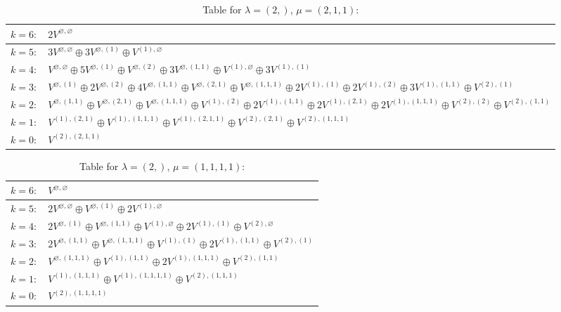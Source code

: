 \documentclass[a4paper,12pt]{article}
\begin{document}
\renewcommand{\arraystretch}{1.6} 
\begin{table}[H]
\centering
\caption{Table for $\lambda = (2,)$, $\mu = (2, 1, 1)$:}
\begin{tabular}{|>{\centering\arraybackslash}p{15cm}|}
\hline
 $k = 6: \quad 2 V^{\varnothing, \varnothing} $ \\ \hline
 $k = 5: \quad 3 V^{\varnothing, \varnothing} \oplus 3 V^{\varnothing, (1)} \oplus V^{(1), \varnothing} $ \\ \hline
 $k = 4: \quad V^{\varnothing, \varnothing} \oplus 5 V^{\varnothing, (1)} \oplus V^{\varnothing, (2)} \oplus 3 V^{\varnothing, (1, 1)} \oplus V^{(1), \varnothing} \oplus 3 V^{(1), (1)} $ \\ \hline
 $k = 3: \quad V^{\varnothing, (1)} \oplus 2 V^{\varnothing, (2)} \oplus 4 V^{\varnothing, (1, 1)} \oplus V^{\varnothing, (2, 1)} \oplus V^{\varnothing, (1, 1, 1)} \oplus 2 V^{(1), (1)} \oplus 2 V^{(1), (2)} \oplus 3 V^{(1), (1, 1)} \oplus V^{(2), (1)} $ \\ \hline
 $k = 2: \quad V^{\varnothing, (1, 1)} \oplus V^{\varnothing, (2, 1)} \oplus V^{\varnothing, (1, 1, 1)} \oplus V^{(1), (2)} \oplus 2 V^{(1), (1, 1)} \oplus 2 V^{(1), (2, 1)} \oplus 2 V^{(1), (1, 1, 1)} \oplus V^{(2), (2)} \oplus V^{(2), (1, 1)} $ \\ \hline
 $k = 1: \quad V^{(1), (2, 1)} \oplus V^{(1), (1, 1, 1)} \oplus V^{(1), (2, 1, 1)} \oplus V^{(2), (2, 1)} \oplus V^{(2), (1, 1, 1)} $ \\ \hline
 $k = 0: \quad V^{(2), (2, 1, 1)} $ \\ \hline
\end{tabular}
\end{table}

\renewcommand{\arraystretch}{1.6} 
\begin{table}[H]
\centering
\caption{Table for $\lambda = (2,)$, $\mu = (1, 1, 1, 1)$:}
\begin{tabular}{|>{\centering\arraybackslash}p{15cm}|}
\hline
 $k = 6: \quad V^{\varnothing, \varnothing} $ \\ \hline
 $k = 5: \quad 2 V^{\varnothing, \varnothing} \oplus V^{\varnothing, (1)} \oplus 2 V^{(1), \varnothing} $ \\ \hline
 $k = 4: \quad 2 V^{\varnothing, (1)} \oplus V^{\varnothing, (1, 1)} \oplus V^{(1), \varnothing} \oplus 2 V^{(1), (1)} \oplus V^{(2), \varnothing} $ \\ \hline
 $k = 3: \quad 2 V^{\varnothing, (1, 1)} \oplus V^{\varnothing, (1, 1, 1)} \oplus V^{(1), (1)} \oplus 2 V^{(1), (1, 1)} \oplus V^{(2), (1)} $ \\ \hline
 $k = 2: \quad V^{\varnothing, (1, 1, 1)} \oplus V^{(1), (1, 1)} \oplus 2 V^{(1), (1, 1, 1)} \oplus V^{(2), (1, 1)} $ \\ \hline
 $k = 1: \quad V^{(1), (1, 1, 1)} \oplus V^{(1), (1, 1, 1, 1)} \oplus V^{(2), (1, 1, 1)} $ \\ \hline
 $k = 0: \quad V^{(2), (1, 1, 1, 1)} $ \\ \hline
\end{tabular}
\end{table}
\end{document}
